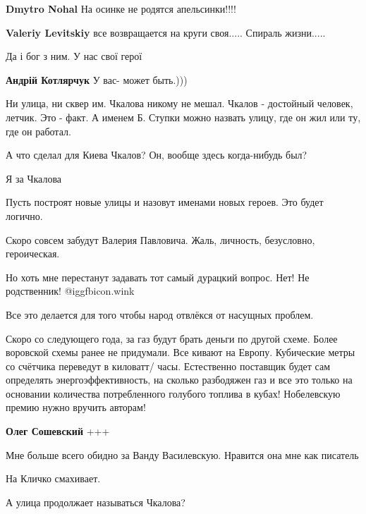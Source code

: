 \begin{itemize}
\begin{itemize}
\textbf{Dmytro Nohal} На осинке не родятся апельсинки!!!!

\textbf{Valeriy Levitskiy} все возвращается на круги своя..... Спираль жизни.....
\end{itemize} %

Да і бог з ним. У нас свої герої

\begin{itemize} %
\textbf{Андрій Котлярчук} У вас- может быть.)))
\end{itemize} %


Ни улица, ни сквер им. Чкалова никому не мешал. Чкалов - достойный человек, летчик.
Это - факт. А именем Б. Ступки можно назвать улицу, где он жил или ту, где он
работал.

\begin{itemize} %
А что сделал для Киева Чкалов? Он, вообще здесь когда-нибудь был?
\end{itemize} %

Я за Чкалова

Пусть построят новые улицы и назовут именами новых героев. Это будет логично.


Скоро совсем забудут Валерия Павловича. Жаль, личность, безусловно, героическая.

Но хоть мне перестанут задавать тот самый дурацкий вопрос. Нет! Не родственник!  @igg{fbicon.wink} 


Все это делается для того чтобы народ отвлёкся от насущных проблем.

Скоро со следующего года, за газ будут брать деньги по другой схеме. Более
воровской схемы ранее не придумали. Все кивают на Европу. Кубические метры со
счётчика переведут в киловатт/ часы. Естественно поставщик будет сам определять
энергоэффективность, на сколько разбодяжен газ и все это только на основании
количества потребленного голубого топлива в кубах! Нобелевскую премию нужно
вручить авторам!

\begin{itemize} %
\textbf{Олег Сошевский} +++
\end{itemize} %

Мне больше всего обидно за Ванду Василевскую. Нравится она мне как писатель

На Кличко смахивает.

А улица продолжает называться Чкалова?

\end{itemize} %
